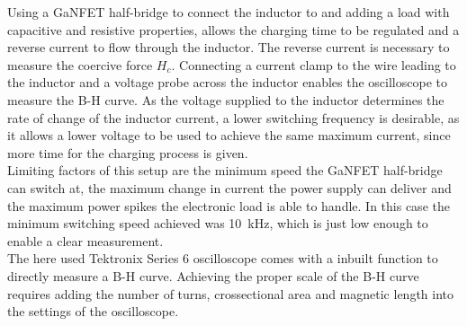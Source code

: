 Using a \ac{GaNFET} half-bridge to connect the inductor to and adding a load with capacitive and resistive properties, allows the charging time to be regulated and a reverse current to flow through the inductor. The reverse current is necessary to measure the coercive force $H_c$. Connecting a current clamp to the wire leading to the inductor and a voltage probe across the inductor enables the oscilloscope to measure the B-H curve. As the voltage supplied to the inductor determines the rate of change of the inductor current, a lower switching frequency is desirable, as it allows a lower voltage to be used to achieve the same maximum current, since more time for the charging process is given.\\
Limiting factors of this setup are the minimum speed the \ac{GaNFET} half-bridge can switch at, the maximum change in current the power supply can deliver and the maximum power spikes the electronic load is able to handle. In this case the minimum switching speed achieved was \SI{10}{\kilo\Hz}, which is just low enough to enable a clear measurement.\\

The here used Tektronix Series 6 oscilloscope comes with a inbuilt function to directly measure a B-H curve. Achieving the proper scale of the B-H curve requires adding the number of turns, crossectional area and magnetic length into the settings of the oscilloscope. \\

